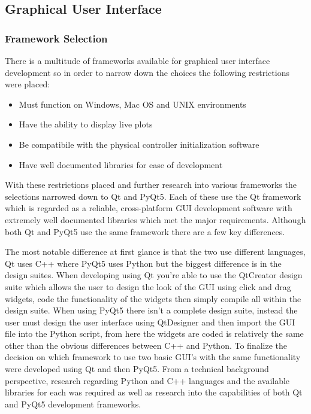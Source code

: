 \subsection{Graphical User Interface}
\subsubsection{Framework Selection}

There is a multitude of frameworks available for graphical user interface development so in order to narrow down the choices the following restrictions were placed: 
\begin{itemize}
	\item Must function on Windows, Mac OS and UNIX environments
	\item Have the ability to display live plots
	\item Be compatibile with the physical controller initialization software
	\item Have well documented libraries for ease of development 
\end{itemize}
With these restrictions placed and further research into various frameworks the selections narrowed down to Qt and PyQt5. Each of these use the Qt framework which is regarded as a reliable, cross-platform GUI development software with extremely well documented libraries which met the major requirements. Although both Qt and PyQt5 use the same framework there are a few key differences. 

The most notable difference at first glance is that the two use different languages, Qt uses C++ where PyQt5 uses Python but the biggest difference is in the design suites. When developing using Qt you're able to use the QtCreator design suite which allows the user to design the look of the GUI using click and drag widgets, code the functionality of the widgets then simply compile all within the design suite. When using PyQt5 there isn't a complete design suite, instead the user must design the user interface using QtDesigner and then import the GUI file into the Python script, from here the widgets are coded is relatively the same other than the obvious differences between C++ and Python. To finalize the decision on which framework to use two basic GUI's with the same functionality were developed using Qt and then PyQt5. From a technical background perspective, research regarding Python and C++ languages and the available libraries for each was required as well as research into the capabilities of both Qt and PyQt5 development frameworks. 


